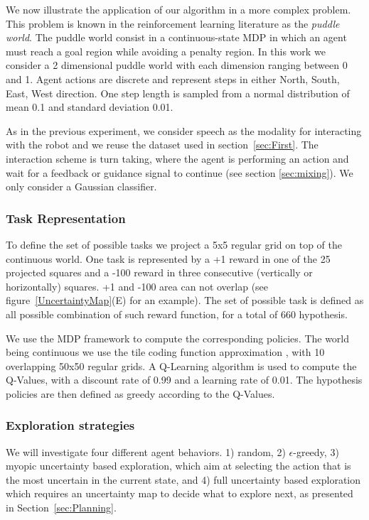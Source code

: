 We now illustrate the application of our algorithm in a more complex problem. This problem is known in the reinforcement learning literature as the \emph{puddle world}. The puddle world consist in a continuous-state MDP in which an agent must reach a goal region while avoiding a penalty region.
% 
In this work we consider a 2 dimensional puddle world with each dimension ranging between 0 and 1. Agent actions are discrete and represent steps in either North, South, East, West direction. One step length is sampled from a normal distribution of mean 0.1 and standard deviation 0.01.

As in the previous experiment, we consider speech as the modality for interacting with the robot and we reuse the dataset used in section~\ref{sec:First}. The interaction scheme is turn taking, where the agent is performing an action and wait for a feedback or guidance signal to continue (see section \ref{sec:mixing}). We only consider a Gaussian classifier.

\subsubsection{Task Representation}
To define the set of possible tasks we project a 5x5 regular grid on top of the continuous world. One task is represented by a +1 reward in one of the 25 projected squares and a -100 reward in three consecutive (vertically or horizontally) squares. +1 and -100 area can not overlap (see figure~\ref{UncertaintyMap}(E) for an example). The set of possible task is defined as all possible combination of such reward function, for a total of 660 hypothesis. 

We use the MDP framework to compute the corresponding policies. The world being continuous we use the tile coding function approximation \cite{sutton1998reinforcement}, with 10 overlapping 50x50 regular grids. %
A Q-Learning algorithm \cite{watkins1992q} is used to compute the Q-Values, with a discount rate of 0.99 and a learning rate of 0.01. The hypothesis policies are then defined as greedy according to the Q-Values.

\subsubsection{Exploration strategies}

We will investigate four different agent behaviors. 1) random, 2) $\epsilon$-greedy, 3) myopic uncertainty based exploration, which aim at selecting the action that is the most uncertain in the current state, and 4) full uncertainty based exploration which requires an uncertainty map to decide what to explore next, as presented in Section~\ref{sec:Planning}. 

